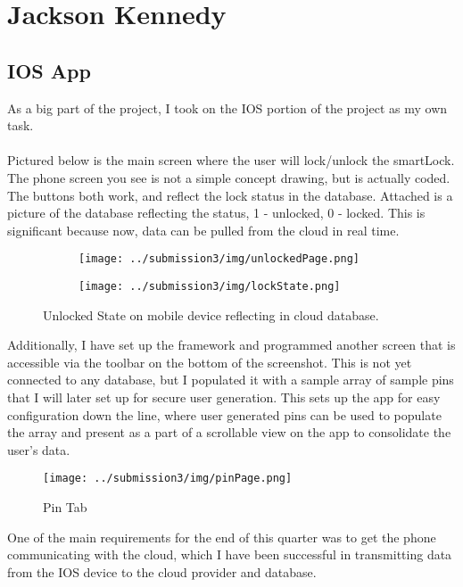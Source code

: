 \section{Jackson Kennedy}

\subsection{IOS App}
As a big part of the project, I took on the IOS portion of the project as my own task.
\\\\
Pictured below is the main screen where the user will lock/unlock the smartLock. The phone screen you see is not a simple concept drawing, but is actually coded. The buttons both work, and reflect the lock status in the database. Attached is a picture of the database reflecting the status, 1 - unlocked, 0 - locked. This is significant because now, data can be pulled from the cloud in real time.
\begin{figure}[h]
     \centering
     \begin{subfigure}{0.3\textwidth}
         \centering
         \texttt{[image: ../submission3/img/unlockedPage.png]}
         \caption{}
         \label{fig:1a}
     \end{subfigure}
     \begin{subfigure}{0.6\textwidth}
         \centering
         \texttt{[image: ../submission3/img/lockState.png]}
         \caption{}
         \label{fig:1b}
     \end{subfigure}
     \caption{Unlocked State on mobile device reflecting in cloud database.}
     \label{fig:1}
\end{figure}
\newpage
Additionally, I have set up the framework and programmed another screen that is accessible via the toolbar on the bottom of the screenshot. This is not yet connected to any database, but I populated it with a sample array of sample pins that I will later set up for secure user generation. This sets up the app for easy configuration down the line, where user generated pins can be used to populate the array and present as a part of a scrollable view on the app to consolidate the user's data.

\begin{figure}[htbp]
    \centering
    \texttt{[image: ../submission3/img/pinPage.png]}
    \caption{Pin Tab}
    \label{fig:pin}
\end{figure}
One of the main requirements for the end of this quarter was to get the phone communicating with the cloud, which I have been successful in transmitting data from the IOS device to the cloud provider and database.

